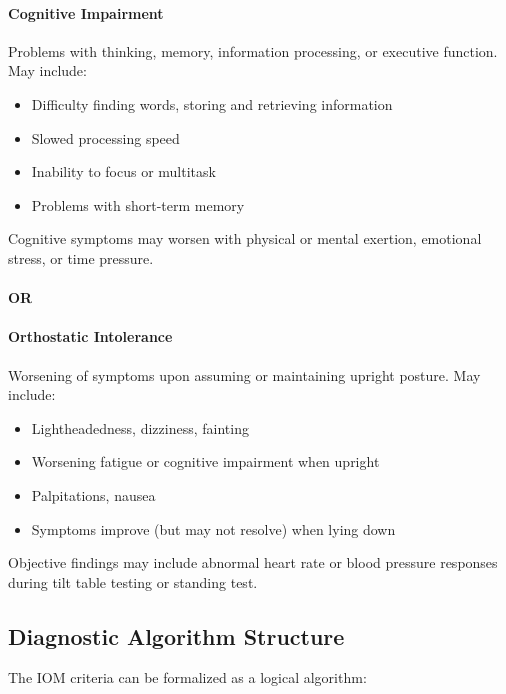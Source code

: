 \begin{requirement}
\label{req:iom-additional}

\paragraph{Cognitive Impairment}
Problems with thinking, memory, information processing, or executive function. May include:
\begin{itemize}
    \item Difficulty finding words, storing and retrieving information
    \item Slowed processing speed
    \item Inability to focus or multitask
    \item Problems with short-term memory
\end{itemize}

Cognitive symptoms may worsen with physical or mental exertion, emotional stress, or time pressure.

\paragraph{OR}

\paragraph{Orthostatic Intolerance}
Worsening of symptoms upon assuming or maintaining upright posture. May include:
\begin{itemize}
    \item Lightheadedness, dizziness, fainting
    \item Worsening fatigue or cognitive impairment when upright
    \item Palpitations, nausea
    \item Symptoms improve (but may not resolve) when lying down
\end{itemize}

Objective findings may include abnormal heart rate or blood pressure responses during tilt table testing or standing test.
\end{requirement}

\subsection{Diagnostic Algorithm Structure}

The IOM criteria can be formalized as a logical algorithm:


